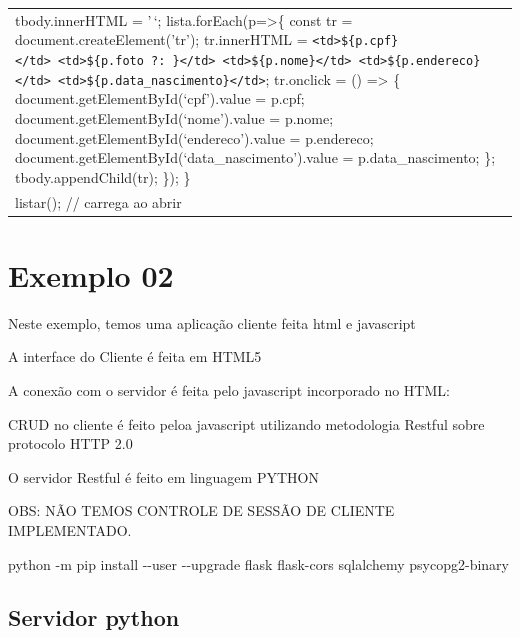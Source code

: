 \documentclass[
]{book}
\newenvironment{Shaded}{\begin{snugshade}}{\end{snugshade}}
\newcommand{\AttributeTok}[1]{\textcolor[rgb]{0.13,0.29,0.53}{#1}}
\newcommand{\NormalTok}[1]{#1}
\begin{document}
\begin{longtable}[]{@{}
  >{\raggedright\arraybackslash}p{}@{}}
tbody.innerHTML = '\,`;
lista.forEach(p=\textgreater\{
const tr = document.createElement('tr');
tr.innerHTML = \texttt{\textless{}td\textgreater{}\$\{p.cpf\}\textless{}/td\textgreater{}\ \textless{}td\textgreater{}\$\{p.foto\ ?}\texttt{:\ \textquotesingle{}\textquotesingle{}\}\textless{}/td\textgreater{}\ \textless{}td\textgreater{}\$\{p.nome\}\textless{}/td\textgreater{}\ \textless{}td\textgreater{}\$\{p.endereco\}\textless{}/td\textgreater{}\ \textless{}td\textgreater{}\$\{p.data\_nascimento\}\textless{}/td\textgreater{}};
tr.onclick = () =\textgreater{} \{
document.getElementById(`cpf').value = p.cpf;
document.getElementById(`nome').value = p.nome;
document.getElementById(`endereco').value = p.endereco;
document.getElementById(`data\_nascimento').value = p.data\_nascimento;
\};
tbody.appendChild(tr);
\});
\} \\
listar(); // carrega ao abrir
 \\
\end{longtable}

\section{Exemplo 02}\label{exemplo-02}

Neste exemplo, temos uma aplicação cliente feita html e javascript

A interface do Cliente é feita em HTML5

A conexão com o servidor é feita pelo javascript incorporado no HTML:

CRUD no cliente é feito peloa javascript utilizando metodologia Restful sobre protocolo HTTP 2.0

O servidor Restful é feito em linguagem PYTHON

OBS: NÃO TEMOS CONTROLE DE SESSÃO DE CLIENTE IMPLEMENTADO.

\begin{Shaded}
\begin{Highlighting}[]
\NormalTok{python }\AttributeTok{{-}m}\NormalTok{ pip install {-}}\AttributeTok{{-}user}\NormalTok{ {-}}\AttributeTok{{-}upgrade}\NormalTok{ flask flask}\AttributeTok{{-}cors}\NormalTok{ sqlalchemy psycopg2}\AttributeTok{{-}binary}
\end{Highlighting}
\end{Shaded}

\subsection{Servidor python}\label{servidor-python}
\end{document}
